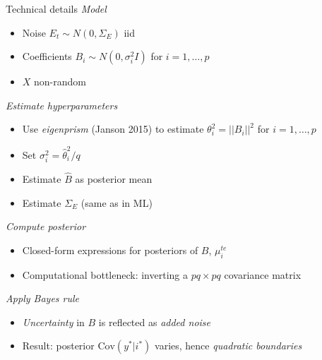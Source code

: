 \documentclass[final]{beamer}
\newlength{\sepwid}
\newlength{\onecolwid}
\begin{document}
\begin{frame}[t]
\begin{columns}[t]
\begin{column}{\onecolwid}
\begin{alertblock}{Technical details}
\emph{Model}

\begin{itemize}
\item Noise $E_t \sim N(0, \Sigma_E)$ iid 
\item Coefficients $B_i \sim N(0, \sigma^2_i I)$ for $i = 1, \hdots, p$
\item $X$ non-random
\end{itemize}

\emph{Estimate hyperparameters}

\begin{itemize}
\item Use \emph{eigenprism} (Janson 2015) to estimate $\theta_i^2 = ||B_i||^2$ for $i =1,\hdots, p$
\item Set $\sigma^2_i = \hat{\theta}_i^2/q$
\item Estimate $\hat{B}$ as posterior mean
\item Estimate $\Sigma_E$ (same as in ML)
\end{itemize}

\emph{Compute posterior}
\begin{itemize}
\item Closed-form expressions for posteriors of $B$, $\mu_i^{te}$
\item Computational bottleneck: inverting a $pq \times pq$ covariance matrix
\end{itemize}

\emph{Apply Bayes rule}

\begin{itemize}
\item \emph{Uncertainty} in $B$ is reflected as \emph{added noise}
\item Result: posterior $\text{Cov}(y^*|i^*)$ varies, hence \emph{quadratic boundaries}
\end{itemize}

\end{alertblock}



\end{column} %

\begin{column}{\sepwid}\end{column} %

\begin{column}{\onecolwid} %


\end{column}
\end{columns}
\end{frame}
\end{document}
